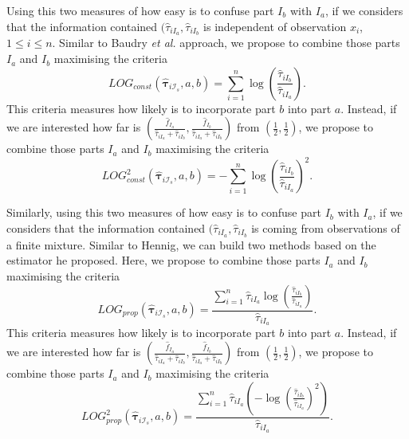 \documentclass[10pt, a4paper]{article}
\newcommand{\m}[1]{\boldsymbol{#1}}
\begin{document}
Using this two measures of how easy is to confuse part $I_b$ with $I_a$, if we considers that the information contained $(\hat{\tau}_{iI_a}, \hat{\tau}_{iI_b}$ is independent of observation $x_i$, $1 \leq i \leq n$. Similar to Baudry \emph{et al.} approach, we propose to combine those parts $I_a$ and $I_b$ maximising the criteria
\[
LOG_{const}( \hat{\m \tau}_{i \mathcal{I}_s}, a, b) = \sum_{i=1}^n \log (\frac{ \hat{\tau}_{iI_b} }{ \hat{\tau}_{iI_a} }).
\]
This criteria measures how likely is to incorporate part $b$ into part $a$. Instead, if we are interested how far is $(\frac{\hat{f}_{I_a}}{\hat{\tau}_{iI_a} + \hat{\tau}_{iI_b}}, \frac{\hat{f}_{I_b}}{\hat{\tau}_{iI_a} + \hat{\tau}_{iI_b}})$ from $(\frac{1}{2}, \frac{1}{2})$, we propose to combine those parts $I_a$ and $I_b$ maximising the criteria
\[
LOG^2_{const}( \hat{\m \tau}_{i \mathcal{I}_s}, a, b) = -\sum_{i=1}^n \log (\frac{ \hat{\tau}_{iI_b} }{ \hat{\tau}_{iI_a} })^2.
\]

Similarly, using this two measures of how easy is to confuse part $I_b$ with $I_a$, if we considers that the information contained $(\hat{\tau}_{iI_a}, \hat{\tau}_{iI_b}$ is coming from observations of a finite mixture. Similar to Hennig, we can build two methods based on the estimator he proposed. Here, we propose to combine those parts $I_a$ and $I_b$ maximising the criteria
\[
LOG_{prop}( \hat{\m \tau}_{i \mathcal{I}_s}, a, b) = \frac{ \sum_{i=1}^n \hat{\tau}_{iI_a} \log (\frac{ \hat{\tau}_{iI_b} }{ \hat{\tau}_{iI_a} })}{\hat{\tau}_{iI_a}}.
\]
This criteria measures how likely is to incorporate part $b$ into part $a$. Instead, if we are interested how far is $(\frac{\hat{f}_{I_a}}{\hat{\tau}_{iI_a} + \hat{\tau}_{iI_b}}, \frac{\hat{f}_{I_b}}{\hat{\tau}_{iI_a} + \hat{\tau}_{iI_b}})$ from $(\frac{1}{2}, \frac{1}{2})$, we propose to combine those parts $I_a$ and $I_b$ maximising the criteria
\[
LOG^2_{prop}( \hat{\m \tau}_{i \mathcal{I}_s}, a, b) = \frac{ \sum_{i=1}^n \hat{\tau}_{iI_a} (-\log (\frac{ \hat{\tau}_{iI_b} }{ \hat{\tau}_{iI_a} })^2)}{\hat{\tau}_{iI_a}}.
\]
\end{document}
